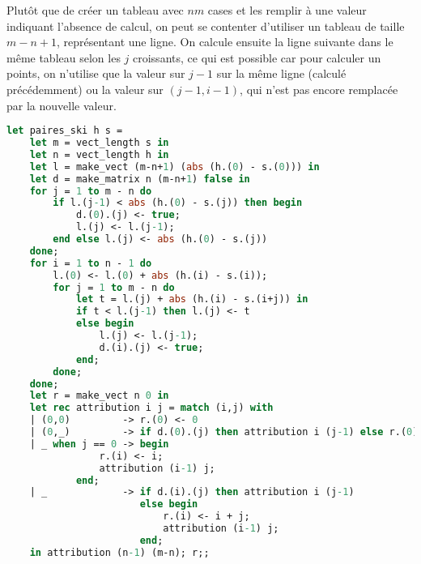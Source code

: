\documentclass{article}
\begin{document}
Plutôt que de créer un tableau avec $nm$ cases et les remplir à une valeur indiquant l'absence de calcul, on peut se contenter d'utiliser un tableau de taille $m-n+1$, représentant une ligne. On calcule ensuite la ligne suivante dans le même tableau selon les $j$ croissants, ce qui est possible car pour calculer un points, on n'utilise que la valeur sur $j-1$ sur la même ligne (calculé précédemment) ou la valeur sur $(j-1,i-1)$, qui n'est pas encore remplacée par la nouvelle valeur.

\begin{lstlisting}[language=Caml]
let paires_ski h s =
    let m = vect_length s in
    let n = vect_length h in
    let l = make_vect (m-n+1) (abs (h.(0) - s.(0))) in
    let d = make_matrix n (m-n+1) false in
    for j = 1 to m - n do
        if l.(j-1) < abs (h.(0) - s.(j)) then begin
            d.(0).(j) <- true;
            l.(j) <- l.(j-1);
        end else l.(j) <- abs (h.(0) - s.(j))
    done;
    for i = 1 to n - 1 do
        l.(0) <- l.(0) + abs (h.(i) - s.(i));
        for j = 1 to m - n do
            let t = l.(j) + abs (h.(i) - s.(i+j)) in
            if t < l.(j-1) then l.(j) <- t
            else begin
                l.(j) <- l.(j-1);
                d.(i).(j) <- true;
            end;
        done;
    done;
    let r = make_vect n 0 in
    let rec attribution i j = match (i,j) with
    | (0,0)         -> r.(0) <- 0
    | (0,_)         -> if d.(0).(j) then attribution i (j-1) else r.(0) <- j
    | _ when j == 0 -> begin
                r.(i) <- i;
                attribution (i-1) j;
            end;
    | _             -> if d.(i).(j) then attribution i (j-1)
                       else begin
                           r.(i) <- i + j;
                           attribution (i-1) j;
                       end;
    in attribution (n-1) (m-n); r;;
\end{lstlisting}
\end{document}
